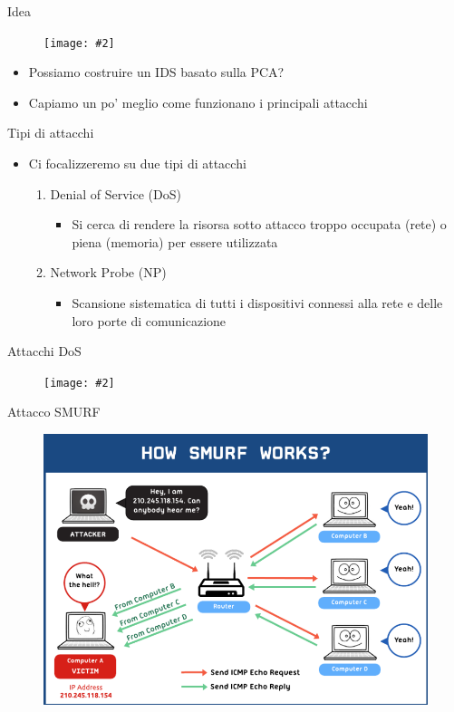 \documentclass[xcolor={dvipsnames}]{beamer}
\newcommand{\figcen}[2]{
	\begin{figure}
		\begin{center}
			\texttt{[image: \#2]}
		\end{center}
	\end{figure}
}
\begin{document}
		\begin{frame}{Idea}
			\figcen{.3\textwidth}{idea}
			\begin{itemize}
				\item Possiamo costruire un IDS basato sulla PCA?
				\item Capiamo un po' meglio come funzionano i principali attacchi
			\end{itemize}
		\end{frame}
		
		\begin{frame}{Tipi di attacchi}
			\begin{itemize}
				\item Ci focalizzeremo su due tipi di attacchi
				\begin{enumerate}
					\item Denial of Service (DoS)
					\begin{itemize}
						\item Si cerca di rendere la risorsa sotto attacco troppo occupata (rete) o piena (memoria) per essere utilizzata
					\end{itemize}
						\item Network Probe (NP)
					\begin{itemize}
						\item Scansione sistematica di tutti i dispositivi connessi alla rete e delle loro porte di comunicazione
					\end{itemize}
				\end{enumerate}
			\end{itemize}
		\end{frame}

		\begin{frame}{Attacchi DoS}
			\figcen{.8\textwidth}{dos}
		\end{frame}
		
		\begin{frame}{Attacco SMURF}
			\begin{figure}
				\begin{center}
					\includegraphics[width=.75\textwidth]{smurf}
				\end{center}
			\end{figure}
		\end{frame}
		
\end{document}
